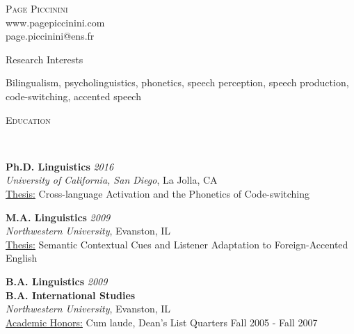 \documentclass[9pt]{article}
\newenvironment{changemargin}[2]{%
  \begin{list}{}{%
    \setlength{\topsep}{0pt}%
    \setlength{\leftmargin}{#1}%
    \setlength{\rightmargin}{#2}%
    \setlength{\listparindent}{\parindent}%
    \setlength{\itemindent}{\parindent}%
    \setlength{\parsep}{\parskip}%
  }%
  \item[]}{\end{list}
}
\newcommand{\lineover}{
	\begin{changemargin}{-0.05in}{-0.05in}
		\vspace*{-8pt}
		\hrulefill \\
		\vspace*{-2pt}
	\end{changemargin}
}
\newcommand{\header}[1]{
	\begin{changemargin}{-0.5in}{-0.5in}
		\scshape{#1}\\
  	\lineover
	\end{changemargin}
}
\newcommand{\contact}[4]{
	\begin{changemargin}{-0.5in}{-0.5in}
		\begin{center}
			{\Large \scshape {#1}}\\ \smallskip
			{#2}\\ \smallskip 
			{#3}\\ \smallskip
			{#4}\smallskip
		\end{center}
	\end{changemargin}
}
\newenvironment{body} {
	\vspace*{-16pt}
	\begin{changemargin}{-0.25in}{-0.5in}
  }	
	{\end{changemargin}
}
\begin{document}
\contact{Page Piccinini}{www.pagepiccinini.com}{page.piccinini@ens.fr}






\header{Research Interests}

\begin{body}
	\vspace{14pt}
	Bilingualism, psycholinguistics, phonetics, speech perception, speech production, code-switching, accented speech
\end{body}

\smallskip


\header{Education}

\begin{body}
	\vspace{14pt}
	\textbf{Ph.D. Linguistics} \hfill \emph{2016} \\
	\emph{University of California, San Diego}, La Jolla, CA \\
	\underline{Thesis:} Cross-language Activation and the Phonetics of Code-switching\\
  \medskip

	\textbf{M.A. Linguistics} \hfill \emph{2009} \\
	\emph{Northwestern University}, Evanston, IL\\
	\underline{Thesis:} Semantic Contextual Cues and Listener Adaptation to Foreign-Accented English\\
  \medskip

	\textbf{B.A. Linguistics} \hfill \emph{2009} \\
	\textbf{B.A. International Studies} \\
	\emph{Northwestern University}, Evanston, IL\\
	\underline{Academic Honors:} Cum laude, Dean's List Quarters Fall 2005 - Fall 2007\\

\end{body}
\end{document}
